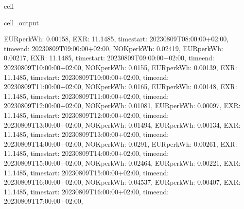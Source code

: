 \documentclass[letterpaper,10pt,english]{jupyterBook}
\begin{document}
\begin{sphinxuseclass}{cell}
\begin{sphinxVerbatimOutput}
\begin{sphinxuseclass}{cell_output}
\begin{sphinxVerbatim}[commandchars=\\\{\}]
\PYGZsq{}EUR\PYGZus{}per\PYGZus{}kWh\PYGZsq{}: 0.00158, \PYGZsq{}EXR\PYGZsq{}: 11.1485, \PYGZsq{}time\PYGZus{}start\PYGZsq{}: \PYGZsq{}2023\PYGZhy{}08\PYGZhy{}09T08:00:00+02:00\PYGZsq{}, \PYGZsq{}time\PYGZus{}end\PYGZsq{}: \PYGZsq{}2023\PYGZhy{}08\PYGZhy{}09T09:00:00+02:00\PYGZsq{}\PYGZcb{}, \PYGZob{}\PYGZsq{}NOK\PYGZus{}per\PYGZus{}kWh\PYGZsq{}: 0.02419, \PYGZsq{}EUR\PYGZus{}per\PYGZus{}kWh\PYGZsq{}: 0.00217, \PYGZsq{}EXR\PYGZsq{}: 11.1485, \PYGZsq{}time\PYGZus{}start\PYGZsq{}: \PYGZsq{}2023\PYGZhy{}08\PYGZhy{}09T09:00:00+02:00\PYGZsq{}, \PYGZsq{}time\PYGZus{}end\PYGZsq{}: \PYGZsq{}2023\PYGZhy{}08\PYGZhy{}09T10:00:00+02:00\PYGZsq{}\PYGZcb{}, \PYGZob{}\PYGZsq{}NOK\PYGZus{}per\PYGZus{}kWh\PYGZsq{}: 0.0155, \PYGZsq{}EUR\PYGZus{}per\PYGZus{}kWh\PYGZsq{}: 0.00139, \PYGZsq{}EXR\PYGZsq{}: 11.1485, \PYGZsq{}time\PYGZus{}start\PYGZsq{}: \PYGZsq{}2023\PYGZhy{}08\PYGZhy{}09T10:00:00+02:00\PYGZsq{}, \PYGZsq{}time\PYGZus{}end\PYGZsq{}: \PYGZsq{}2023\PYGZhy{}08\PYGZhy{}09T11:00:00+02:00\PYGZsq{}\PYGZcb{}, \PYGZob{}\PYGZsq{}NOK\PYGZus{}per\PYGZus{}kWh\PYGZsq{}: 0.0165, \PYGZsq{}EUR\PYGZus{}per\PYGZus{}kWh\PYGZsq{}: 0.00148, \PYGZsq{}EXR\PYGZsq{}: 11.1485, \PYGZsq{}time\PYGZus{}start\PYGZsq{}: \PYGZsq{}2023\PYGZhy{}08\PYGZhy{}09T11:00:00+02:00\PYGZsq{}, \PYGZsq{}time\PYGZus{}end\PYGZsq{}: \PYGZsq{}2023\PYGZhy{}08\PYGZhy{}09T12:00:00+02:00\PYGZsq{}\PYGZcb{}, \PYGZob{}\PYGZsq{}NOK\PYGZus{}per\PYGZus{}kWh\PYGZsq{}: 0.01081, \PYGZsq{}EUR\PYGZus{}per\PYGZus{}kWh\PYGZsq{}: 0.00097, \PYGZsq{}EXR\PYGZsq{}: 11.1485, \PYGZsq{}time\PYGZus{}start\PYGZsq{}: \PYGZsq{}2023\PYGZhy{}08\PYGZhy{}09T12:00:00+02:00\PYGZsq{}, \PYGZsq{}time\PYGZus{}end\PYGZsq{}: \PYGZsq{}2023\PYGZhy{}08\PYGZhy{}09T13:00:00+02:00\PYGZsq{}\PYGZcb{}, \PYGZob{}\PYGZsq{}NOK\PYGZus{}per\PYGZus{}kWh\PYGZsq{}: 0.01494, \PYGZsq{}EUR\PYGZus{}per\PYGZus{}kWh\PYGZsq{}: 0.00134, \PYGZsq{}EXR\PYGZsq{}: 11.1485, \PYGZsq{}time\PYGZus{}start\PYGZsq{}: \PYGZsq{}2023\PYGZhy{}08\PYGZhy{}09T13:00:00+02:00\PYGZsq{}, \PYGZsq{}time\PYGZus{}end\PYGZsq{}: \PYGZsq{}2023\PYGZhy{}08\PYGZhy{}09T14:00:00+02:00\PYGZsq{}\PYGZcb{}, \PYGZob{}\PYGZsq{}NOK\PYGZus{}per\PYGZus{}kWh\PYGZsq{}: 0.0291, \PYGZsq{}EUR\PYGZus{}per\PYGZus{}kWh\PYGZsq{}: 0.00261, \PYGZsq{}EXR\PYGZsq{}: 11.1485, \PYGZsq{}time\PYGZus{}start\PYGZsq{}: \PYGZsq{}2023\PYGZhy{}08\PYGZhy{}09T14:00:00+02:00\PYGZsq{}, \PYGZsq{}time\PYGZus{}end\PYGZsq{}: \PYGZsq{}2023\PYGZhy{}08\PYGZhy{}09T15:00:00+02:00\PYGZsq{}\PYGZcb{}, \PYGZob{}\PYGZsq{}NOK\PYGZus{}per\PYGZus{}kWh\PYGZsq{}: 0.02464, \PYGZsq{}EUR\PYGZus{}per\PYGZus{}kWh\PYGZsq{}: 0.00221, \PYGZsq{}EXR\PYGZsq{}: 11.1485, \PYGZsq{}time\PYGZus{}start\PYGZsq{}: \PYGZsq{}2023\PYGZhy{}08\PYGZhy{}09T15:00:00+02:00\PYGZsq{}, \PYGZsq{}time\PYGZus{}end\PYGZsq{}: \PYGZsq{}2023\PYGZhy{}08\PYGZhy{}09T16:00:00+02:00\PYGZsq{}\PYGZcb{}, \PYGZob{}\PYGZsq{}NOK\PYGZus{}per\PYGZus{}kWh\PYGZsq{}: 0.04537, \PYGZsq{}EUR\PYGZus{}per\PYGZus{}kWh\PYGZsq{}: 0.00407, \PYGZsq{}EXR\PYGZsq{}: 11.1485, \PYGZsq{}time\PYGZus{}start\PYGZsq{}: \PYGZsq{}2023\PYGZhy{}08\PYGZhy{}09T16:00:00+02:00\PYGZsq{}, \PYGZsq{}time\PYGZus{}end\PYGZsq{}: \PYGZsq{}2023\PYGZhy{}08\PYGZhy{}09T17:00:00+02:00\PYGZsq{}\PYGZcb{}, 
\end{sphinxVerbatim}
\end{sphinxuseclass}
\end{sphinxVerbatimOutput}
\end{sphinxuseclass}
\end{document}
